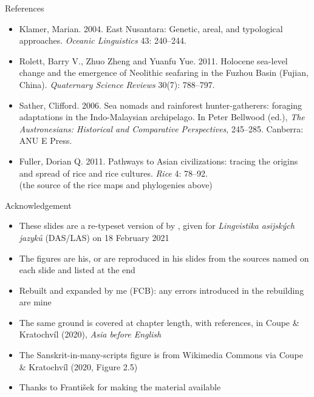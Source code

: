 \documentclass{beamer}
\begin{document}
\begin{frame}[allowframebreaks]{References}
\begin{itemize}
    McConvell. 2014. Wanderwörter in languages of the Americas and Australia.
    \textit{Ampersand} 1: 1--18.
    \href{https://doi.org/10.1016/j.amper.2014.10.001}{DOI~10.1016/j.amper.2014.10.001}
  \item Klamer, Marian. 2004. East Nusantara: Genetic, areal, and typological
    approaches. \textit{Oceanic Linguistics} 43: 240--244.
  \item Rolett, Barry V., Zhuo Zheng and Yuanfu Yue. 2011. Holocene sea-level
    change and the emergence of Neolithic seafaring in the Fuzhou Basin
    (Fujian, China). \textit{Quaternary Science Reviews} 30(7): 788--797.
  \item Sather, Clifford. 2006. Sea nomads and rainforest hunter-gatherers:
    foraging adaptations in the Indo-Malaysian archipelago. In Peter Bellwood
    (ed.), \textit{The Austronesians: Historical and Comparative
      Perspectives}, 245--285. Canberra: ANU E Press.
  \item Fuller, Dorian Q. 2011. Pathways to Asian civilizations: tracing the
    origins and spread of rice and rice cultures. \textit{Rice} 4: 78--92.
    \\ {\scriptsize (the source of the rice maps and phylogenies above)}
  \end{itemize}
\end{frame}
\begin{frame}{Acknowledgement}
  \begin{itemize}
  \item These slides are a re-typeset version of  by , given for
    \textit{Lingvistika asijských jazyků} (DAS/LAS) on 18 February 2021
  \item The figures are his, or are reproduced in his slides from the sources
    named on each slide and listed at the end
  \item Rebuilt and expanded by me (FCB): any errors introduced in the
    rebuilding are mine
  \item The same ground is covered at chapter length, with references, in
    Coupe \& Kratochvíl (2020), \textit{Asia before English}
  \item The Sanskrit-in-many-scripts figure is from Wikimedia Commons via
    Coupe \& Kratochvíl (2020, Figure 2.5)
  \item Thanks to František for making the material available
  \end{itemize}
\end{frame}
\end{document}
